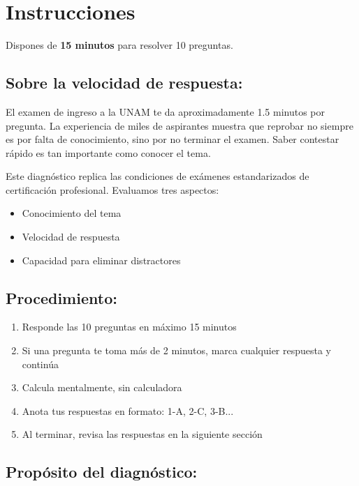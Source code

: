 \renewcommand{\tema}{Examen Diagnóstico - Cinemática}

\twocolumn
\section{Instrucciones}

Dispones de \textbf{15 minutos} para resolver 10 preguntas.

\begin{instruccionbox}
\subsection{Sobre la velocidad de respuesta:}

El examen de ingreso a la UNAM te da aproximadamente 1.5 minutos por pregunta. La experiencia de miles de aspirantes muestra que reprobar no siempre es por falta de conocimiento, sino por no terminar el examen. Saber contestar rápido es tan importante como conocer el tema.

Este diagnóstico replica las condiciones de exámenes estandarizados de certificación profesional. Evaluamos tres aspectos:

\begin{itemize}
    \item Conocimiento del tema
    \item Velocidad de respuesta
    \item Capacidad para eliminar distractores
\end{itemize}
\end{instruccionbox}

\subsection{Procedimiento:}

\begin{enumerate}
    \item Responde las 10 preguntas en máximo 15 minutos
    \item Si una pregunta te toma más de 2 minutos, marca cualquier respuesta y continúa
    \item Calcula mentalmente, sin calculadora
    \item Anota tus respuestas en formato: 1-A, 2-C, 3-B...
    \item Al terminar, revisa las respuestas en la siguiente sección
\end{enumerate}

\subsection{Propósito del diagnóstico:}

